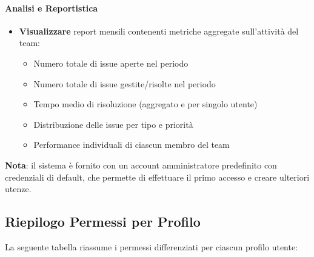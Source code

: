\paragraph{Analisi e Reportistica}
\begin{itemize}[leftmargin=1.1em]
\item \textbf{Visualizzare} report mensili contenenti metriche aggregate sull'attività del team:
  \begin{itemize}
  \item Numero totale di issue aperte nel periodo
  \item Numero totale di issue gestite/risolte nel periodo
  \item Tempo medio di risoluzione (aggregato e per singolo utente)
  \item Distribuzione delle issue per tipo e priorità
  \item Performance individuali di ciascun membro del team
  \end{itemize}
\end{itemize}

\textbf{Nota}: il sistema è fornito con un account amministratore predefinito con credenziali di default, che permette di effettuare il primo accesso e creare ulteriori utenze.

\newpage

\subsection{Riepilogo Permessi per Profilo}
\label{subsec:riepilogo-permessi}

La seguente tabella riassume i permessi differenziati per ciascun profilo utente:

